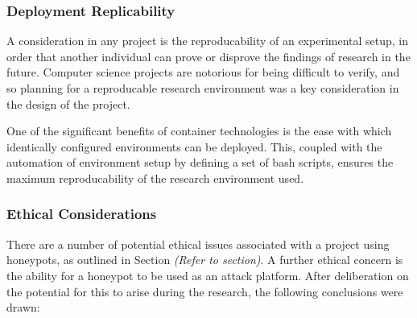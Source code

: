 		\subsubsection{Deployment Replicability}
		
		A consideration in any project is the reproducability of an experimental setup, in order that another individual can prove or disprove the findings of research in the future. Computer science projects are notorious for being difficult to verify, and so planning for a reproducable research environment was a key consideration in the design of the project.
		
		One of the significant benefits of container technologies is the ease with which identically configured environments can be deployed. This, coupled with the automation of environment setup by defining a set of bash scripts, ensures the maximum reproducability of the research environment used. 
		
		\subsubsection{Ethical Considerations}
		There are a number of potential ethical issues associated with a project using honeypots, as outlined in Section \textit{(Refer to section)}. A further ethical concern is the ability for a honeypot to be used as an attack platform. After deliberation on the potential for this to arise during the research, the following conclusions were drawn: 	
		
